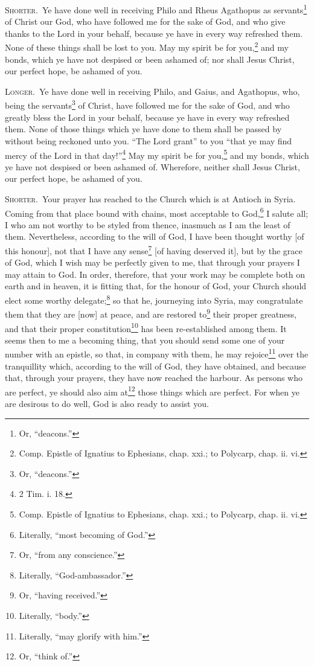 \textsc{Shorter.}~Ye have done well in receiving Philo and Rheus Agathopus as servants\footnote{Or, “deacons.”} of Christ our God, who have followed me for the sake of God, and who give thanks to the Lord in your behalf, because ye have in every way refreshed them. None of these things shall be lost to you. May my spirit be for you,\footnote{Comp. Epistle of Ignatius to Ephesians, chap. xxi.; to Polycarp, chap. ii. vi.} and my bonds, which ye have not despised or been ashamed of; nor shall Jesus Christ, our perfect hope, be ashamed of you.

\textsc{Longer.}~Ye have done well in receiving Philo, and Gaius, and Agathopus, who, being the servants\footnote{Or, “deacons.”} of Christ, have followed me for the sake of God, and who greatly bless the Lord in your behalf, because ye have in every way refreshed them. None of those things which ye have done to them shall be passed by without being reckoned unto you. “The Lord grant” to you “that ye may find mercy of the Lord in that day!”\footnote{2 Tim. i. 18.} May my spirit be for you,\footnote{Comp. Epistle of Ignatius to Ephesians, chap. xxi.; to Polycarp, chap. ii. vi.} and my bonds, which ye have not despised or been ashamed of. Wherefore, neither shall Jesus Christ, our perfect hope, be ashamed of you.


\textsc{Shorter.}~Your prayer has reached to the Church which is at Antioch in Syria. Coming from that place bound with chains, most acceptable to God,\footnote{Literally, “most becoming of God.”} I salute all; I who am not worthy to be styled from thence, inasmuch as I am the least of them. Nevertheless, according to the will of God, I have been thought worthy [of this honour], not that I have any sense\footnote{Or, “from any conscience.”} [of having deserved it], but by the grace of God, which I wish may be perfectly given to me, that through your prayers I may attain to God. In order, therefore, that your work may be complete both on earth and in heaven, it is fitting that, for the honour of God, your Church should elect some worthy delegate;\footnote{Literally, “God-ambassador.”} so that he, journeying into Syria, may congratulate them that they are [now] at peace, and are restored to\footnote{Or, “having received.”} their proper greatness, and that their proper constitution\footnote{Literally, “body.”} has been re-established among them. It seems then to me a becoming thing, that you should send some one of your number with an epistle, so that, in company with them, he may rejoice\footnote{Literally, “may glorify with him.”} over the tranquillity which, according to the will of God, they have obtained, and because that, through your prayers, they have now reached the harbour. As persons who are perfect, ye should also aim at\footnote{Or, “think of.”} those things which are perfect. For when ye are desirous to do well, God is also ready to assist you.

